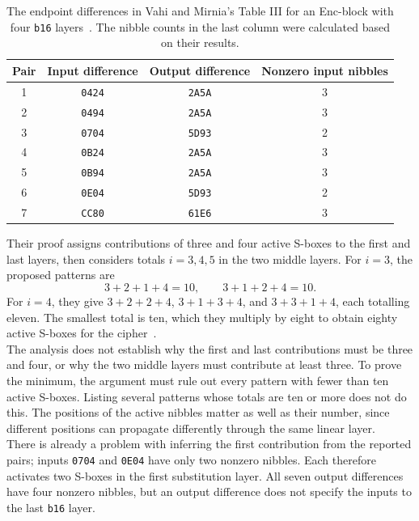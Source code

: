 \documentclass[11pt]{article}
\begin{document}
\begin{table}[htbp]
\centering
\begin{tabular}{cccc}
\toprule
Pair & Input difference & Output difference & Nonzero input nibbles\\
\midrule
1 & \texttt{0424} & \texttt{2A5A} & 3\\
2 & \texttt{0494} & \texttt{2A5A} & 3\\
3 & \texttt{0704} & \texttt{5D93} & 2\\
4 & \texttt{0B24} & \texttt{2A5A} & 3\\
5 & \texttt{0B94} & \texttt{2A5A} & 3\\
6 & \texttt{0E04} & \texttt{5D93} & 2\\
7 & \texttt{CC80} & \texttt{61E6} & 3\\
\bottomrule
\end{tabular}
\caption{The endpoint differences in Vahi and Mirnia's Table III for an
Enc-block with four \texttt{b16} layers~\cite{separ-differential}.
The nibble counts in the last column were calculated based on their results.}
\label{tab:prior-pairs}
\end{table}

Their proof assigns contributions of three and four active S-boxes to the
first and last layers, then considers totals \(i=3,4,5\) in the two middle
layers. For \(i=3\), the proposed patterns are
\[
 3+2+1+4=10,\qquad 3+1+2+4=10.
\]
For \(i=4\), they give \(3+2+2+4\), \(3+1+3+4\), and
\(3+3+1+4\), each totalling eleven. The smallest total is ten, which they multiply by eight to
obtain eighty active S-boxes for the cipher~\cite{separ-differential}.\\

The analysis does not establish why the
first and last contributions must be three and four, or why the two
middle layers must contribute at least three. To prove the minimum,
the argument must rule out every pattern with fewer than ten active
S-boxes. Listing several patterns whose totals are ten or more does
not do this. The positions of the active nibbles matter as well as
their number, since different positions can propagate differently
through the same linear layer.\\

There is already a problem with inferring the first contribution from
the reported pairs; inputs \texttt{0704} and \texttt{0E04} have only two
nonzero nibbles. Each therefore activates two S-boxes in the first
substitution layer. All seven output differences have four nonzero
nibbles, but an output difference does not specify the inputs to the
last \texttt{b16} layer.\\
\end{document}

